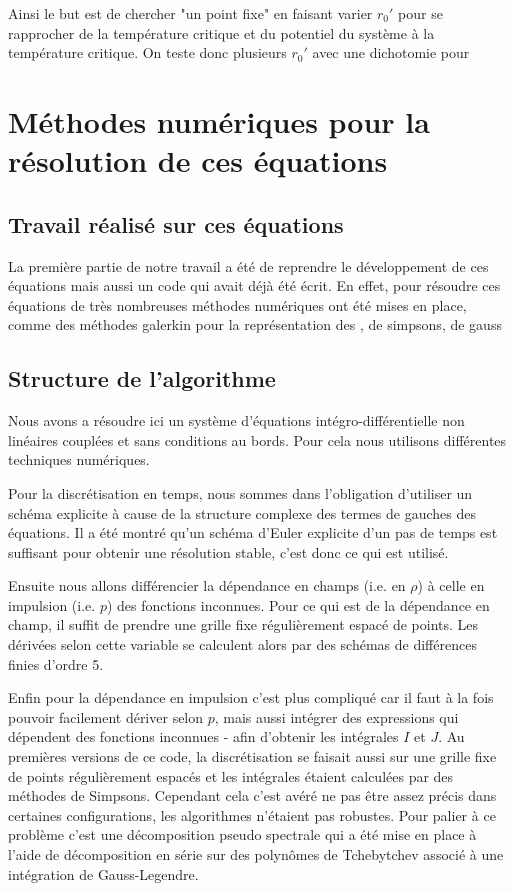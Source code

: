 \documentclass[10pt]{article}
\begin{document}
\begin{multicols}{2}
Ainsi le but est de chercher "un point fixe" en faisant varier $r_0'$ pour se rapprocher de la température critique et du potentiel du système à la température critique. On teste donc plusieurs $r_0'$ avec une dichotomie pour 


\vspace*{11pt}



\section{Méthodes numériques pour la résolution de ces équations}

\subsection{Travail réalisé sur ces équations}

La première partie de notre travail a été de reprendre le développement de ces équations mais aussi un code qui avait déjà été écrit. En effet, pour résoudre ces équations de très nombreuses méthodes numériques ont été mises en place, comme des méthodes galerkin \cite{shen1994efficient, LeonardThesis} pour la représentation des , de simpsons, de gauss 

\subsection{Structure de l'algorithme}

Nous avons a résoudre ici un système d'équations intégro-différentielle non linéaires couplées et sans conditions au bords. Pour cela nous utilisons différentes techniques numériques. 

Pour la discrétisation en temps, nous sommes dans l'obligation d'utiliser un schéma explicite à cause de la structure complexe des termes de gauches des équations. Il a été montré qu'un schéma d'Euler explicite d'un pas de temps est suffisant pour obtenir une résolution stable, c'est donc ce qui est utilisé. 

Ensuite nous allons différencier la dépendance en champs (i.e. en $\rho$) à celle en impulsion (i.e. $p$) des fonctions inconnues. Pour ce qui est de la dépendance en champ, il suffit de prendre une grille fixe régulièrement espacé de points. Les dérivées selon cette variable se calculent alors par des schémas de différences finies d'ordre 5. 

Enfin pour la dépendance en impulsion c'est plus compliqué car il faut à la fois pouvoir facilement dériver selon $p$, mais aussi intégrer des expressions qui dépendent des fonctions inconnues - afin d'obtenir les intégrales $I$ et $J$. Au premières versions de ce code, la discrétisation se faisait aussi sur une grille fixe de points régulièrement espacés et les intégrales étaient calculées par des méthodes de Simpsons. Cependant cela c'est avéré ne pas être assez précis dans certaines configurations, les algorithmes n'étaient pas robustes. Pour palier à ce problème c'est une décomposition pseudo spectrale qui a été mise en place à l'aide de décomposition en série sur des polynômes de Tchebytchev associé à une intégration de Gauss-Legendre. 


\end{multicols}
\end{document}
